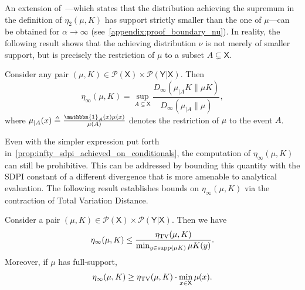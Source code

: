 \documentclass[conference,letterpaper]{IEEEtran}
\def \X{\mathsf X}
\def \Y{\mathsf Y}
\def \calP{\mathcal P}
\def \supp {\mathrm{supp}}
\begin{document}
An extension of~\cite[Theorem 4]{jin2024properties}---which states that the distribution achieving the supremum in the definition of $\eta_2(\mu, K)$ has support strictly smaller than the one of $\mu$---can be obtained for $\alpha\to\infty$ (see~\cref{appendix:proof_boundary_nu}). In reality, the following result shows that the achieving distribution $\nu$ is not merely of smaller support, but is precisely the restriction of $\mu$ to a subset $A\subsetneq\X$.
\vspace{1.5em}
\begin{theorem}\label{prop:infty_sdpi_achieved_on_conditionals}
    Consider any pair $(\mu, K)\in\calP(\X)\times\calP(\Y|\X)$. Then
    \begin{equation*}
        \eta_\infty(\mu, K) = \sup_{A\subsetneq\X}\frac{D_\infty\left(\mu_{|A} K\|\mu K\right)}{D_\infty\left(\mu_{|A}\|\mu\right)},
    \end{equation*}
    where $\mu_{|A}(x) \triangleq \frac{\mathbbm{1}_A(x)\mu(x)}{\mu(A)}$ denotes the restriction of $\mu$ to the event $A$.
\end{theorem}
Even with the simpler expression put forth in~\cref{prop:infty_sdpi_achieved_on_conditionals}, the computation of $\eta_\infty(\mu, K)$ can still be prohibitive. This can be addressed by bounding this quantity with the SDPI constant of a different divergence that is more amenable to analytical evaluation. The following result establishes bounds on $\eta_\infty(\mu, K)$ via the contraction of Total Variation Distance.
\begin{proposition}\label{prop:bounds_on_renyi_infty_sdpi_by_tv}
    Consider a pair $(\mu, K)\in\calP(\X)\times\calP(\Y|\X)$. Then we have
    \begin{equation}\label{eq:ub_on_renyi_infty_sdpi_by_tv}
    \eta_\infty(\mu, K) \leq \frac{\eta_{\rm TV}(\mu, K)}{\min_{y\in\supp(\mu K)}\mu K(y)}.
    \end{equation}
    Moreover, if $\mu$ has full-support,
    \begin{equation}\label{eq:lb_on_renyi_infty_sdpi_by_tv}
        \eta_\infty(\mu, K)\geq\eta_{\rm TV}(\mu, K)\cdot\min_{x\in\X}\mu(x).
    \end{equation}
\end{proposition}
\end{document}
